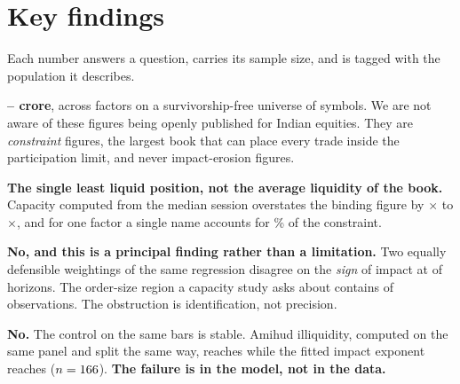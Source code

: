 \documentclass[11pt,a4paper]{article}
\begin{document}
\vspace{0.2em}

\section*{Key findings}

Each number answers a question, carries its sample size, and is tagged with the population it
describes.

\begin{finding}[title={1.\ \ How much can a standard factor actually deploy?
  \hfill\tagindep}]
\textbf{\rupee\fsFactorBindingMin--\fsFactorBindingMax{} crore}, across \fsNFactors{} factors on a
survivorship-free universe of \fsNSymbols{} symbols. We are not aware of these figures being
openly published for Indian equities. They are \emph{constraint} figures, the largest book that
can place every trade inside the participation limit, and never impact-erosion figures.
\end{finding}

\begin{finding}[title={2.\ \ What sets that number? \hfill\tagindep}]
\textbf{The single least liquid position, not the average liquidity of the book.} Capacity computed
from the median session overstates the binding figure by \fsMomentumMedianOverBinding{}$\times$ to
\fsReversalMedianOverBinding{}$\times$, and for one factor a single name accounts for
\fsReversalOneName\% of the constraint.
\end{finding}

\begin{finding}[title={3.\ \ Can daily data price market impact? \hfill\tagindep}]
\textbf{No, and this is a principal finding rather than a limitation.} Two equally defensible
weightings of the same regression disagree on the \emph{sign} of impact at
\fsSignDisagreements{} of \fsHorizonsTested{} horizons. The order-size region a capacity study asks
about contains \fsSymbolDaysBelowTarget{} of \fsIdentSymbolDays{} observations. The obstruction is
identification, not precision.
\end{finding}

\begin{finding}[title={4.\ \ Is that just noisy data? \hfill\tagindep}]
\textbf{No.} The control on the same bars is stable. Amihud illiquidity, computed on the same
panel and split the same way, reaches \fsAmihudSpearman{} while the fitted impact exponent reaches
\fsDeltaSpearman{} ($n=166{}$). \textbf{The failure is in the model, not in the data.}
\end{finding}
\end{document}
